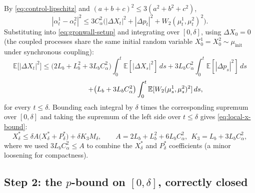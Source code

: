 \documentclass[11pt]{article}
\theoremstyle{remark}
\begin{document}
By \eqref{eq:control-lipschitz} and $(a+b+c)^2 \le 3(a^2+b^2+c^2)$,
\[
    |\alpha_t^1-\alpha_t^2|^2 \le 3C_\alpha^2\big(|\Delta X_t|^2 + |\Delta p_t|^2 +
    W_2(\mu_t^1,\mu_t^2)^2\big).
\]
Substituting into \eqref{eq:gronwall-setup} and integrating over $[0,\delta]$, using
$\Delta X_0 = 0$ (the coupled processes share the same initial random variable
$X_0^1=X_0^2 \sim \mu_{\mathrm{init}}$ under synchronous coupling):
\[
    \mathbb{E}\big[|\Delta X_t|^2\big] \le
    \big(2L_b+L_b^2+3L_bC_\alpha^2\big)\int_0^t \mathbb{E}[|\Delta X_s|^2]\,ds
    + 3L_bC_\alpha^2\int_0^t \mathbb{E}[|\Delta p_s|^2]\,ds
\]
\[
    \hspace{4.5em} + \big(L_b+3L_bC_\alpha^2\big)\int_0^t
    \mathbb{E}[W_2(\mu_s^1,\mu_s^2)^2]\,ds,
\]
for every $t \le \delta$. Bounding each integral by $\delta$ times the corresponding
supremum over $[0,\delta]$ and taking the supremum of the left side over $t\le\delta$
gives \eqref{eq:local-x-bound}:
\[
    X^*_\delta \le \delta A\big(X^*_\delta + P^*_\delta\big) + \delta K_3 M_\delta,
    \qquad A = 2L_b+L_b^2+6L_bC_\alpha^2,\ \ K_3 = L_b+3L_bC_\alpha^2,
\]
where we used $3L_bC_\alpha^2 \le A$ to combine the $X^*_\delta$ and $P^*_\delta$
coefficients (a minor loosening for compactness).

\subsection{Step 2: the $p$-bound on $[0,\delta]$, correctly closed}
\end{document}

